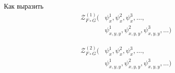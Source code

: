 \begin{problem}
Как выразить
\begin{equation*}
\begin{split}
\mathcal Z^{(1)}_{F \circ G} (&\psi_x^1, \psi_x^2, \psi_x^3, \dots, \\
						&\psi_{x,y,y}^1, \psi_{x,y,y}^2, \psi_{x,y,y}^3, \dots)
\end{split}
\end{equation*}

\begin{equation*}
\begin{split}
\mathcal Z^{(2)}_{F \circ G} (&\psi_x^1, \psi_x^2, \psi_x^3, \dots, \\
						&\psi_{x,y,y}^1, \psi_{x,y,y}^2, \psi_{x,y,y}^3, \dots)
\end{split}
\end{equation*}
\end{problem}

